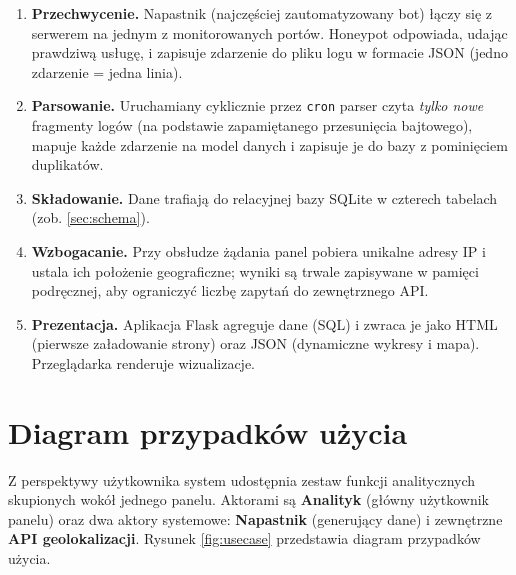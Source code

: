 \documentclass[12pt,a4paper]{report}
\begin{document}
\begin{enumerate}
  \item \textbf{Przechwycenie.} Napastnik (najczęściej zautomatyzowany bot)
        łączy się z serwerem na jednym z monitorowanych portów. Honeypot
        odpowiada, udając prawdziwą usługę, i zapisuje zdarzenie do pliku logu
        w formacie JSON (jedno zdarzenie = jedna linia).
  \item \textbf{Parsowanie.} Uruchamiany cyklicznie przez \texttt{cron} parser
        czyta \emph{tylko nowe} fragmenty logów (na podstawie zapamiętanego
        przesunięcia bajtowego), mapuje każde zdarzenie na model danych
        i zapisuje je do bazy z pominięciem duplikatów.
  \item \textbf{Składowanie.} Dane trafiają do relacyjnej bazy SQLite
        w czterech tabelach (zob. \ref{sec:schema}).
  \item \textbf{Wzbogacanie.} Przy obsłudze żądania panel pobiera unikalne
        adresy IP i ustala ich położenie geograficzne; wyniki są trwale
        zapisywane w pamięci podręcznej, aby ograniczyć liczbę zapytań do
        zewnętrznego API.
  \item \textbf{Prezentacja.} Aplikacja Flask agreguje dane (SQL) i zwraca je
        jako HTML (pierwsze załadowanie strony) oraz JSON (dynamiczne wykresy
        i mapa). Przeglądarka renderuje wizualizacje.
\end{enumerate}

\section{Diagram przypadków użycia}

Z perspektywy użytkownika system udostępnia zestaw funkcji analitycznych
skupionych wokół jednego panelu. Aktorami są \textbf{Analityk} (główny
użytkownik panelu) oraz dwa aktory systemowe: \textbf{Napastnik} (generujący
dane) i zewnętrzne \textbf{API geolokalizacji}. Rysunek \ref{fig:usecase}
przedstawia diagram przypadków użycia.
\end{document}
